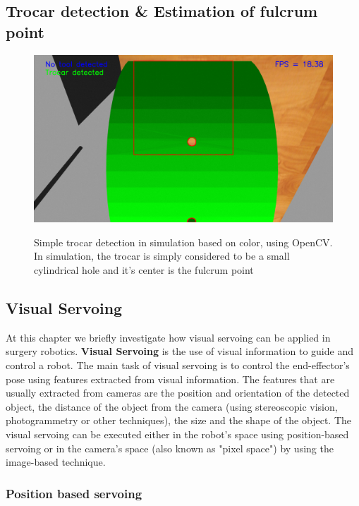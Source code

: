 \subsection{Trocar detection \& Estimation of fulcrum point}

\begin{center}
\begin{figure}[H]
\centering
\includegraphics[width=12cm]{images/opencv-trocar-detection.png}\\
\caption{Simple trocar detection in simulation based on color, using OpenCV. In simulation, the trocar is simply considered to be a small 
cylindrical hole and it's center is the fulcrum point}
\end{figure}
\end{center}

\subsection{Visual Servoing}

At this chapter we briefly investigate how visual servoing can be applied in surgery robotics. \textbf{Visual Servoing} is the use of visual information 
to guide and control a robot. The main task of visual servoing is to control the end-effector's pose using features extracted from visual information. The 
features that are usually extracted from cameras are the position and orientation of the detected object, the distance of the object from the camera (using 
stereoscopic vision, photogrammetry or other techniques), the size and the shape of the object. The visual servoing can be executed either in the robot's space 
using position-based servoing or in the camera's space (also known as "pixel space") by using the image-based technique.

\subsubsection{Position based servoing}

